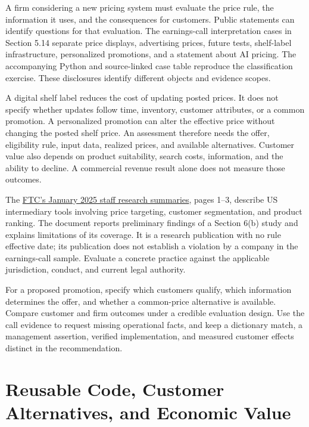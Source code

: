 \noindent \noindent A firm considering a new pricing system must evaluate the
price rule, the information it uses, and the consequences for customers.
Public statements can identify questions for that evaluation. The
earnings-call interpretation cases in Section 5.14 separate price
displays, advertising prices, future tests, shelf-label infrastructure,
personalized promotions, and a statement about AI pricing. The
accompanying Python and source-linked case table reproduce the
classification exercise. These disclosures identify different objects
and evidence scopes.

A digital shelf label reduces the cost of updating posted prices. It
does not specify whether updates follow time, inventory, customer
attributes, or a common promotion. A personalized promotion can alter
the effective price without changing the posted shelf price. An
assessment therefore needs the offer, eligibility rule, input data,
realized prices, and available alternatives. Customer value also depends
on product suitability, search costs, information, and the ability to
decline. A commercial revenue result alone does not measure those
outcomes.

The
\href{https://www.ftc.gov/system/files/ftc_gov/pdf/p246202_surveillancepricing6bstudy_researchsummaries_redacted.pdf}{FTC's
January 2025 staff research summaries}, pages 1--3, describe US
intermediary tools involving price targeting, customer segmentation, and
product ranking. The document reports preliminary findings of a Section
6(b) study and explains limitations of its coverage. It is a research
publication with no rule effective date; its publication does not
establish a violation by a company in the earnings-call sample. Evaluate
a concrete practice against the applicable jurisdiction, conduct, and
current legal authority.

For a proposed promotion, specify which customers qualify, which
information determines the offer, and whether a common-price alternative
is available. Compare customer and firm outcomes under a credible
evaluation design. Use the call evidence to request missing operational
facts, and keep a dictionary match, a management assertion, verified
implementation, and measured customer effects distinct in the
recommendation.

\hypertarget{M08-reusable-code-customer-alternatives-and-economic-value}{%
\section{Reusable Code, Customer Alternatives, and Economic
Value}\label{M08-reusable-code-customer-alternatives-and-economic-value}}

